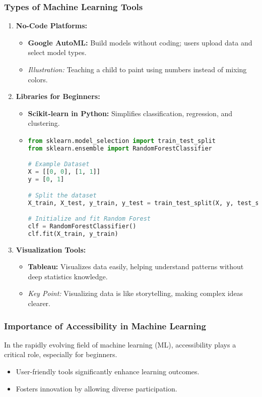 \documentclass[aspectratio=169]{beamer}
\begin{document}
\begin{frame}[fragile]
    \frametitle{Types of Machine Learning Tools}
    \begin{enumerate}
        \item \textbf{No-Code Platforms:}
        \begin{itemize}
            \item \textbf{Google AutoML:} Build models without coding; users upload data and select model types.
            \item \textit{Illustration:} Teaching a child to paint using numbers instead of mixing colors.
        \end{itemize}
    
        \item \textbf{Libraries for Beginners:}
        \begin{itemize}
            \item \textbf{Scikit-learn in Python:} Simplifies classification, regression, and clustering.
            \item \begin{lstlisting}[language=Python]
from sklearn.model_selection import train_test_split
from sklearn.ensemble import RandomForestClassifier

# Example Dataset
X = [[0, 0], [1, 1]]
y = [0, 1]

# Split the dataset
X_train, X_test, y_train, y_test = train_test_split(X, y, test_size=0.5)

# Initialize and fit Random Forest
clf = RandomForestClassifier()
clf.fit(X_train, y_train)
            \end{lstlisting}
        \end{itemize}
        
        \item \textbf{Visualization Tools:}
        \begin{itemize}
            \item \textbf{Tableau:} Visualizes data easily, helping understand patterns without deep statistics knowledge.
            \item \textit{Key Point:} Visualizing data is like storytelling, making complex ideas clearer.
        \end{itemize}
    \end{enumerate}
\end{frame}

\begin{frame}[fragile]
    \frametitle{Importance of Accessibility in Machine Learning}
    In the rapidly evolving field of machine learning (ML), accessibility plays a critical role, especially for beginners. 
    \begin{itemize}
        \item User-friendly tools significantly enhance learning outcomes.
        \item Fosters innovation by allowing diverse participation.
    \end{itemize}
\end{frame}
\end{document}
